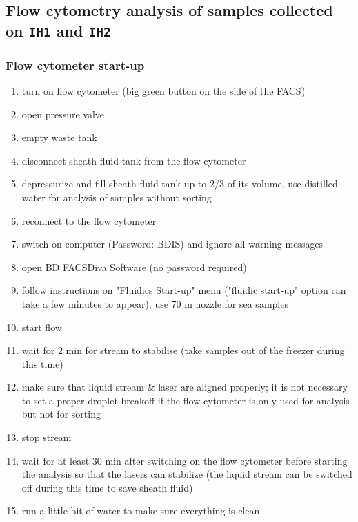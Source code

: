 \subsection{Flow cytometry analysis of samples collected on \texttt{IH1} and \texttt{IH2}}
\label{task:20180211_cj1}


\subsubsection{Flow cytometer start-up}

\begin{enumerate}
\item turn on flow cytometer (big green button on the side of the FACS)
\item open pressure valve
\item empty waste tank
\item disconnect sheath fluid tank from the flow cytometer
\item depressurize and fill sheath fluid tank up to 2/3 of its volume, use distilled water for analysis of samples without sorting
\item reconnect to the flow cytometer
\item switch on computer (Password: BDIS) and ignore all warning messages
\item open BD FACSDiva Software (no password required)
\item follow instructions on "Fluidics Start-up" menu ("fluidic start-up" option can take a few minutes to appear), use 70 \textmu m nozzle for sea samples
\item start flow
\item wait for 2 min for stream to stabilise (take samples out of the freezer during this time)
\item make sure that liquid stream \& laser are aligned properly; it is not necessary to set a proper droplet breakoff if the flow cytometer is only used for analysis but not for sorting
\item stop stream
\item wait for at least 30 min after switching on the flow cytometer before starting the analysis so that the lasers can stabilize (the liquid stream can be switched off during this time to save sheath fluid)
\item run a little bit of water to make sure everything is clean
\end{enumerate}

